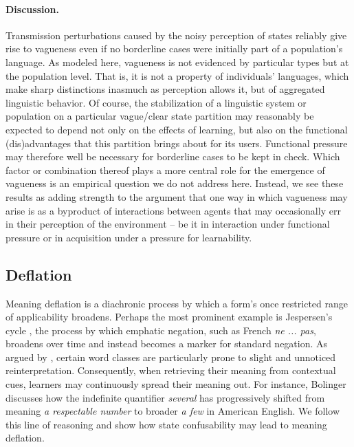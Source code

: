 \documentclass[10pt,a4paper]{article}
\begin{document}
\paragraph{Discussion.}
Transmission perturbations caused by the noisy perception of states reliably give rise to vagueness even if no borderline cases were initially part of a population's language. As modeled here, vagueness is not evidenced by particular types but at the population level. That is, it is not a property of individuals' languages, which make sharp distinctions inasmuch as perception allows it, but of aggregated linguistic behavior. Of course, the stabilization of a linguistic system or population on a particular vague/clear state partition may reasonably be expected to depend not only on the effects of learning, but also on the functional (dis)advantages that this partition brings about for its users. Functional pressure may therefore well be necessary for borderline cases to be kept in check. Which factor or combination thereof plays a more central role for the emergence of vagueness is an empirical question we do not address here. Instead, we see these results as adding strength to the argument that one way in which vagueness may arise is as a byproduct of interactions between agents that may occasionally err in their perception of the environment -- be it in interaction under functional pressure or in acquisition under a pressure for learnability. 

\subsection{Deflation}
Meaning deflation is a diachronic process by which a form's once restricted range of applicability broadens. Perhaps the most prominent example is Jespersen's cycle \citep{dahl:1979}, the process by which emphatic negation, such as French {\em ne ... pas}, broadens over time and instead becomes a marker for standard negation. As argued by \citet{bolinger:1981}, certain word classes are particularly prone to slight and unnoticed reinterpretation. Consequently, when retrieving their meaning from contextual cues, learners may continuously spread their meaning out. For instance, Bolinger discusses how the indefinite quantifier {\em several} has progressively shifted from meaning {\em a respectable number} to broader {\em a few} in American English. We follow this line of reasoning and show how state confusability may lead to meaning deflation.
\end{document}
